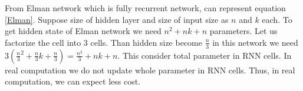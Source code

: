 From Elman network which is fully recurrent network, can represent equation \ref{Elman}. Suppose size of hidden layer and size of input size as $n$ and $k$ each. To get hidden state of Elman network we need $n^2+nk+n$ parameters. Let us factorize the cell into 3 cells. Than hidden size become $\frac{n}{3}$ in this network we need $3(\frac{n}{3}^2+\frac{n}{3}k+\frac{n}{3}) = \frac{n^2}{3}+nk+n$. This consider total parameter in RNN cells. In real computation we do not update whole parameter in RNN cells. Thus, in real computation, we can expect less cost.


